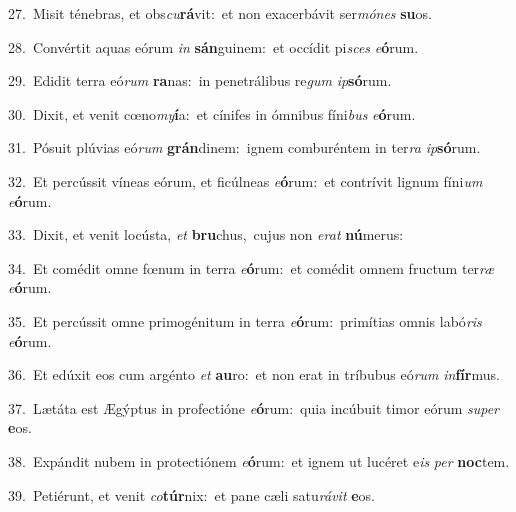 {\numbfont\textcolor{\numbcolor}{27.}}~Misit ténebras, et obs\-\textit{cu}\-\textbf{rá}vit:~\star et non exacerbávit ser\-\textit{mó}\-\textit{nes} \textbf{su}\-os.\par
{\numbfont\textcolor{\numbcolor}{28.}}~Convértit aquas eórum \textit{in} \textbf{sán}\-guinem:~\star et occídit pi\textit{sces} \textit{e}\-\textbf{ó}rum.\par
{\numbfont\textcolor{\numbcolor}{29.}}~Edidit terra eó\textit{rum} \textbf{ra}\-nas:~\star in penetrálibus re\textit{gum} \textit{ip}\-\textbf{só}rum.\par
{\numbfont\textcolor{\numbcolor}{30.}}~Dixit, et venit cœno\-\textit{my}\-\textbf{í}a:~\star et cínifes in ómnibus fíni\textit{bus} \textit{e}\-\textbf{ó}rum.\par
{\numbfont\textcolor{\numbcolor}{31.}}~Pósuit plúvias eó\textit{rum} \textbf{grán}\-dinem:~\star ignem comburéntem in ter\textit{ra} \textit{ip}\-\textbf{só}rum.\par
{\numbfont\textcolor{\numbcolor}{32.}}~Et percússit víneas eórum, et ficúlneas \textit{e}\-\textbf{ó}rum:~\star et contrívit lignum fíni\textit{um} \textit{e}\-\textbf{ó}rum.\par
{\numbfont\textcolor{\numbcolor}{33.}}~Dixit, et venit locústa, \textit{et} \textbf{bru}\-chus,~\star cujus non \textit{e}\-\textit{rat} \textbf{nú}\-merus:\par
{\numbfont\textcolor{\numbcolor}{34.}}~Et comédit omne fœnum in terra \textit{e}\-\textbf{ó}rum:~\star et comédit omnem fructum ter\textit{ræ} \textit{e}\-\textbf{ó}rum.\par
{\numbfont\textcolor{\numbcolor}{35.}}~Et percússit omne primogénitum in terra \textit{e}\-\textbf{ó}rum:~\star primítias omnis labó\textit{ris} \textit{e}\-\textbf{ó}rum.\par
{\numbfont\textcolor{\numbcolor}{36.}}~Et edúxit eos cum argénto \textit{et} \textbf{au}\-ro:~\star et non erat in tríbubus eó\textit{rum} \textit{in}\-\textbf{fír}mus.\par
{\numbfont\textcolor{\numbcolor}{37.}}~Lætáta est Ægýptus in profectióne \textit{e}\-\textbf{ó}rum:~\star quia incúbuit timor eórum \textit{su}\-\textit{per} \textbf{e}\-os.\par
{\numbfont\textcolor{\numbcolor}{38.}}~Expándit nubem in protectiónem \textit{e}\-\textbf{ó}rum:~\star et ignem ut lucéret e\textit{is} \textit{per} \textbf{noc}\-tem.\par
{\numbfont\textcolor{\numbcolor}{39.}}~Petiérunt, et venit \textit{co}\-\textbf{túr}nix:~\star et pane cæli satu\-\textit{rá}\-\textit{vit} \textbf{e}\-os.\par
